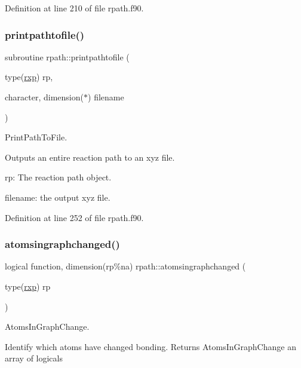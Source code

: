 Definition at line 210 of file rpath.\+f90.

\mbox{\label{namespacerpath_a04757ca5d0ed595868763b0883801c03}} 
\subsubsection{\texorpdfstring{printpathtofile()}{printpathtofile()}}
{\footnotesize\ttfamily subroutine rpath\+::printpathtofile (\begin{DoxyParamCaption}\item[{type(\mbox{\hyperlink{structrpath_1_1rxp}{rxp}})}]{rp,  }\item[{character, dimension($\ast$)}]{filename }\end{DoxyParamCaption})}



Print\+Path\+To\+File. 

Outputs an entire reaction path to an xyz file.


\begin{DoxyItemize}
\item rp\+: The reaction path object.
\item filename\+: the output xyz file. 
\end{DoxyItemize}

Definition at line 252 of file rpath.\+f90.

\mbox{\label{namespacerpath_a78a0f8974549227aa339b790407b8c60}} 
\subsubsection{\texorpdfstring{atomsingraphchanged()}{atomsingraphchanged()}}
{\footnotesize\ttfamily logical function, dimension(rp\%na) rpath\+::atomsingraphchanged (\begin{DoxyParamCaption}\item[{type(\mbox{\hyperlink{structrpath_1_1rxp}{rxp}})}]{rp }\end{DoxyParamCaption})}



Atoms\+In\+Graph\+Change. 

Identify which atoms have changed bonding. Returns Atoms\+In\+Graph\+Change an array of logicals


